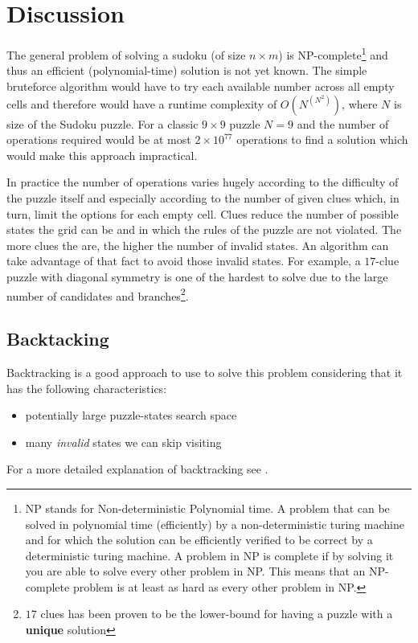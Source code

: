 \section{Discussion}
\label{sudoku:sec:discussion}
The general problem of solving a sudoku (of size $n\times m$) is NP-complete\footnote{NP stands for
Non-deterministic Polynomial time. A problem that can be solved in polynomial time (efficiently) by
a non-deterministic turing machine and for which the solution can be efficiently verified to be
correct by a deterministic turing machine. A problem in NP is complete if by solving it you are able
to solve every other problem in NP. This means that an NP-complete problem is at least as hard as
every other problem in NP.} and thus an efficient (polynomial-time) solution is not yet known. The
simple bruteforce algorithm would have to try each available number across all empty cells and
therefore would have a runtime complexity of $O(N^{(N^2)})$, where $N$ is size of the Sudoku puzzle.
For a classic  $9 \times 9$ puzzle $N = 9$ and the number of operations required would be at most $2
\times 10^{77}$ operations to find a solution which would make this approach
impractical. 

In practice the number of operations varies hugely according to the difficulty of the puzzle itself
and especially according to the number of given clues which, in turn, limit the options for each empty
cell. Clues reduce the number of possible states the grid can be  and in which the rules of the
puzzle are not violated. The more clues the are, the higher the number of invalid states. An algorithm can take
advantage of that fact to avoid those invalid states. For example, a $17$-clue puzzle with diagonal symmetry is
one of the hardest to solve due to the large number of candidates and branches\footnote{$17$ clues
has been proven to be the lower-bound for having a puzzle with a \textbf{unique} solution}. 

\subsection{Backtacking}
\label{sudoku:sec:bruteforce}

Backtracking is a good approach to use to solve this problem considering that it
has the following characteristics:
\begin{itemize}
	\item potentially large puzzle-states search space
	\item many \textit{invalid} states we can skip visiting
\end{itemize}
For a more detailed explanation of backtracking see \cite{backtracking}.

